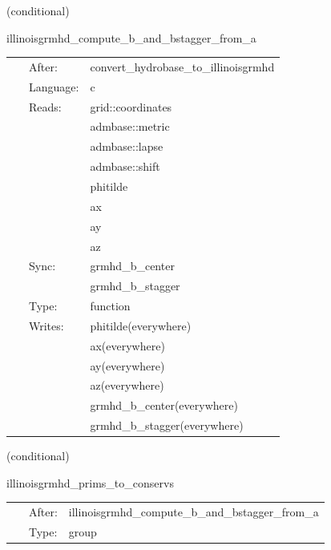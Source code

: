 \vspace{5mm}

   (conditional) 

\hspace{5mm} illinoisgrmhd\_compute\_b\_and\_bstagger\_from\_a 

\hspace{5mm}{\it compute b and b\_stagger from a } 


\hspace{5mm}

 \begin{tabular*}{160mm}{cll} 
~ & After:  & convert\_hydrobase\_to\_illinoisgrmhd \\ 
~ & Language:  & c \\ 
~ & Reads:  & grid::coordinates \\ 
~& ~ &admbase::metric\\ 
~& ~ &admbase::lapse\\ 
~& ~ &admbase::shift\\ 
~& ~ &phitilde\\ 
~& ~ &ax\\ 
~& ~ &ay\\ 
~& ~ &az\\ 
~ & Sync:  & grmhd\_b\_center \\ 
~& ~ &grmhd\_b\_stagger\\ 
~ & Type:  & function \\ 
~ & Writes:  & phitilde(everywhere) \\ 
~& ~ &ax(everywhere)\\ 
~& ~ &ay(everywhere)\\ 
~& ~ &az(everywhere)\\ 
~& ~ &grmhd\_b\_center(everywhere)\\ 
~& ~ &grmhd\_b\_stagger(everywhere)\\ 
\end{tabular*} 


\vspace{5mm}

   (conditional) 

\hspace{5mm} illinoisgrmhd\_prims\_to\_conservs 

\hspace{5mm}{\it compute conservative variables from primitives } 


\hspace{5mm}

 \begin{tabular*}{160mm}{cll} 
~ & After:  & illinoisgrmhd\_compute\_b\_and\_bstagger\_from\_a \\ 
~ & Type:  & group \\ 
\end{tabular*} 


